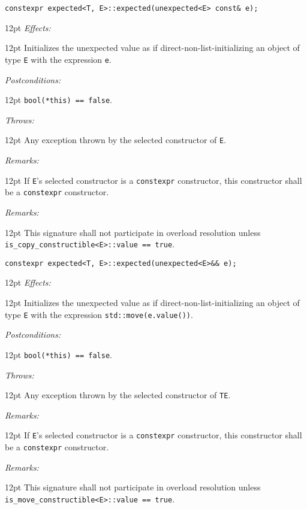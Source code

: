 \documentclass[a4paper,10pt]{article}
\newcommand{\cpp}[1]{\lstinline{#1}}
\newcommand{\wordingItem}[1]{\noindent\textit{#1:}}
\newenvironment{wordingTextItem}[1]{\wordingItem{#1}\vspace{7pt}\noindent\begin{adjustwidth}{12pt}{}}{\vspace{7pt}\end{adjustwidth}}
\newenvironment{wordingPara}{\begin{adjustwidth}{12pt}{}}{\end{adjustwidth}}
\begin{document}
\begin{lstlisting}[xleftmargin=0pt]
constexpr expected<T, E>::expected(unexpected<E> const& e);
\end{lstlisting}
\begin{wordingPara}
\begin{wordingTextItem}{Effects}
Initializes the unexpected value as if direct-non-list-initializing an object of type \cpp{E} with the expression \cpp{e}.
\end{wordingTextItem}
\begin{wordingTextItem}{Postconditions}
\cpp{bool(*this) == false}.
\end{wordingTextItem}
\begin{wordingTextItem}{Throws}
Any exception thrown by the selected constructor of \cpp{E}.
\end{wordingTextItem}
\begin{wordingTextItem}{Remarks}
If \cpp{E}'s selected constructor is a \cpp{constexpr} constructor, this constructor shall be a \cpp{constexpr} constructor.
\end{wordingTextItem}
\begin{wordingTextItem}{Remarks}
This signature shall not participate in overload resolution unless\\
\cpp{is_copy_constructible<E>::value == true}. 
\end{wordingTextItem}
\end{wordingPara}

\begin{lstlisting}[xleftmargin=0pt]
constexpr expected<T, E>::expected(unexpected<E>&& e); 
\end{lstlisting}
\begin{wordingPara}
\begin{wordingTextItem}{Effects}
Initializes the unexpected value as if direct-non-list-initializing an object of type \cpp{E} with the expression \cpp{std::move(e.value())}.
\end{wordingTextItem}
\begin{wordingTextItem}{Postconditions}
\cpp{bool(*this) == false}.
\end{wordingTextItem}
\begin{wordingTextItem}{Throws}
Any exception thrown by the selected constructor of \cpp{TE}.
\end{wordingTextItem}
\begin{wordingTextItem}{Remarks}
If \cpp{E}'s selected constructor is a \cpp{constexpr} constructor, this constructor shall be a \cpp{constexpr} constructor.
\end{wordingTextItem}
\begin{wordingTextItem}{Remarks}
This signature shall not participate in overload resolution unless\\
\cpp{is_move_constructible<E>::value == true}.
\end{wordingTextItem}
\end{wordingPara}
\end{document}
